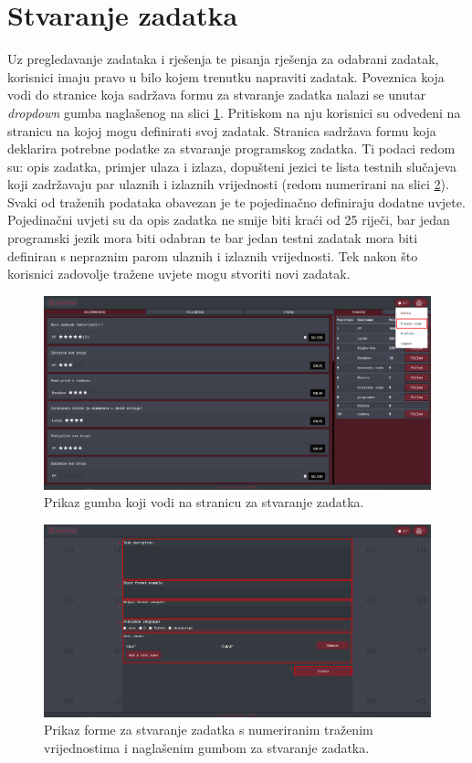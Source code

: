 \documentclass[times, utf8, zavrsni]{fer}
\begin{document}
		\section{Stvaranje zadatka}
		Uz pregledavanje zadataka i rješenja te pisanja rješenja za odabrani zadatak, korisnici imaju pravo u bilo kojem trenutku napraviti zadatak. Poveznica koja vodi do stranice koja sadržava formu za stvaranje zadatka nalazi se unutar \textit{dropdown} gumba naglašenog na slici \ref{fig:dropdowntask}. Pritiskom na nju korisnici su odvedeni na stranicu na kojoj mogu definirati svoj zadatak. Stranica sadržava formu koja deklarira potrebne podatke za stvaranje programskog zadatka. Ti podaci redom su: opis zadatka, primjer ulaza i izlaza, dopušteni jezici te lista testnih slučajeva koji zadržavaju par ulaznih i izlaznih vrijednosti (redom numerirani na slici \ref{fig:stvaranjeforma}). Svaki od traženih podataka obavezan je te pojedinačno definiraju dodatne uvjete. Pojedinačni uvjeti su da opis zadatka ne smije biti kraći od 25 riječi, bar jedan programski jezik mora biti odabran te bar jedan testni zadatak mora biti definiran s nepraznim parom ulaznih i izlaznih vrijednosti. Tek nakon što korisnici zadovolje tražene uvjete mogu stvoriti novi zadatak.
		\begin{figure}[htb]
			\centering
			\includegraphics[width=\linewidth]{pictures/koristenje/StvoriDropdown.png}
			\caption{Prikaz gumba koji vodi na stranicu za stvaranje zadatka.}
			\label{fig:dropdowntask}
		\end{figure}
		\begin{figure}[htb]
			\centering
			\includegraphics[width=\linewidth]{pictures/koristenje/FormaStvaranja.png}
			\caption{Prikaz forme za stvaranje zadatka s numeriranim traženim vrijednostima i naglašenim gumbom za stvaranje zadatka.}
			\label{fig:stvaranjeforma}
		\end{figure}
		
\end{document}
